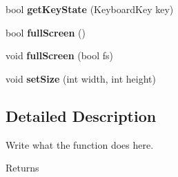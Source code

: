 \begin{DoxyCompactItemize}
\item 
\hypertarget{namespaceDisplay_a9de43ae19f6eaf993ed5ff826fbd5723}{bool {\bfseries get\+Key\+State} (Keyboard\+Key key)}\label{namespaceDisplay_a9de43ae19f6eaf993ed5ff826fbd5723}

\item 
\hypertarget{namespaceDisplay_a556d111fe1177a20bdaadb3ae589d9a8}{bool {\bfseries full\+Screen} ()}\label{namespaceDisplay_a556d111fe1177a20bdaadb3ae589d9a8}

\item 
\hypertarget{namespaceDisplay_a1b74a4469a6edd14a900922c59cc34c4}{void {\bfseries full\+Screen} (bool fs)}\label{namespaceDisplay_a1b74a4469a6edd14a900922c59cc34c4}

\item 
\hypertarget{namespaceDisplay_ae0adcedf815bfd1bd2686010e856d81c}{void {\bfseries set\+Size} (int width, int height)}\label{namespaceDisplay_ae0adcedf815bfd1bd2686010e856d81c}

\end{DoxyCompactItemize}


\subsection{Detailed Description}
Write what the function does here. 

\begin{DoxyReturn}{Returns}

\end{DoxyReturn}
